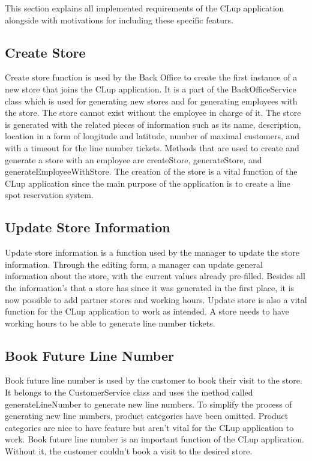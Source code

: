 This section explains all implemented requirements of the CLup application alongside with motivations for including these specific featurs.

\subsection{Create Store}

Create store function is used by the Back Office to create the first instance of a new store that joins the CLup application.
It is a part of the BackOfficeService class which is used for generating new stores and for generating employees with the store.
The store cannot exist without the employee in charge of it.
The store is generated with the related pieces of information such as its name, description,
location in a form of longitude and latitude, number of maximal customers, and with a timeout for the line number tickets.
Methods that are used to create and generate a store with an employee are createStore, generateStore, and generateEmployeeWithStore.
The creation of the store is a vital function of the CLup application since the main purpose of the application is to create a line spot reservation system.

\subsection{Update Store Information}
Update store information is a function used by the manager to update the store information.
Through the editing form, a manager can update general information about the store, with the current values already pre-filled.
Besides all the information's that a store has since it was generated in the first place, it is now possible to add partner stores and working hours.
Update store is also a vital function for the CLup application to work as intended.
A store needs to have working hours to be able to generate line number tickets.

\subsection{Book Future Line Number}
Book future line number is used by the customer to book their visit to the store.
It belongs to the CustomerService class and uses the method called generateLineNumber to generate new line numbers.
To simplify the process of generating new line numbers, product categories have been omitted.
Product categories are nice to have feature but aren’t vital for the CLup application to work.
Book future line number is an important function of the CLup application.
Without it, the customer couldn’t book a visit to the desired store.

